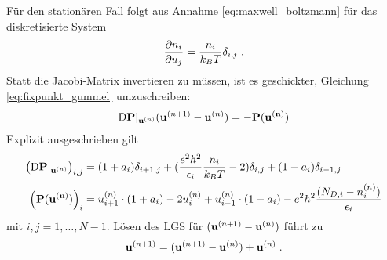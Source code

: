 Für den stationären Fall folgt aus Annahme \eqref{eq:maxwell_boltzmann} für das diskretisierte System
\begin{align*}
  \frac{\mathrm{\partial}n_i}{\mathrm{\partial}u_j} = \frac{n_i}{k_B T}\delta_{i,j} \; .
\end{align*}
Statt die Jacobi-Matrix invertieren zu müssen, ist es geschickter, Gleichung \eqref{eq:fixpunkt_gummel} umzuschreiben:
\begin{align*}
  \mathrm{D}\vb{P}|_{\vb{u}^{(n)}}(\vb{u}^{(n+1)} - \vb{u}^{(n)}) = -  \vb{P}(\vb{u^{(n)}})
\end{align*}
Explizit ausgeschrieben gilt
\begin{align*}
  \left(\mathrm{D}\vb{P}|_{\vb{u}^{(n)}}\right)_{i,j} &=
    (1+a_i)\delta_{i+1,j} + ( \frac{e^2h^2}{\epsilon_i}\frac{n_i}{k_B T} - 2) \delta_{i,j} + (1-a_i)\delta_{i-1,j} \\
  \left( \vb{P}(\vb{u^{(n)}}) \right)_{i} &=
   u_{i+1}^{(n)}\cdot(1+a_i) -2 u_i^{(n)} + u_{i-1}^{(n)}\cdot(1-a_i) - e^2h^2\frac{(N_{D,i} - n_i^{(n)})}{\epsilon_i}
\end{align*}
mit $i,j = 1,\dots,N-1$. Lösen des LGS für $(\vb{u}^{(n+1)} - \vb{u}^{(n)})$ führt zu
\begin{align*}
  \vb{u}^{(n+1)} = (\vb{u}^{(n+1)} - \vb{u}^{(n)}) + \vb{u}^{(n)} \; .
\end{align*}

